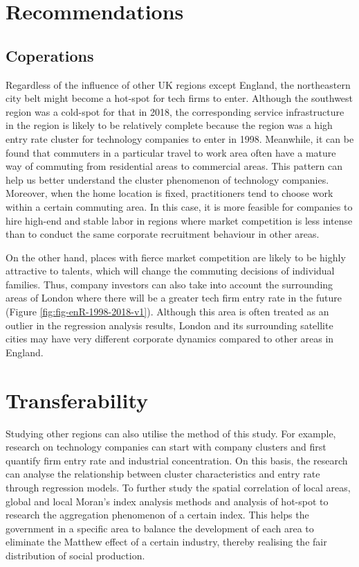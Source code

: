 \documentclass[
  12pt,
  oneside]{book}
\begin{document}
\hypertarget{recommendations}{%
\section{Recommendations}\label{recommendations}}

\hypertarget{coperations}{%
\subsection{Coperations}\label{coperations}}

Regardless of the influence of other UK regions except England, the northeastern city belt might become a hot-spot for tech firms to enter. Although the southwest region was a cold-spot for that in 2018, the corresponding service infrastructure in the region is likely to be relatively complete because the region was a high entry rate cluster for technology companies to enter in 1998. Meanwhile, it can be found that commuters in a particular travel to work area often have a mature way of commuting from residential areas to commercial areas. This pattern can help us better understand the cluster phenomenon of technology companies. Moreover, when the home location is fixed, practitioners tend to choose work within a certain commuting area. In this case, it is more feasible for companies to hire high-end and stable labor in regions where market competition is less intense than to conduct the same corporate recruitment behaviour in other areas.

On the other hand, places with fierce market competition are likely to be highly attractive to talents, which will change the commuting decisions of individual families. Thus, company investors can also take into account the surrounding areas of London where there will be a greater tech firm entry rate in the future (Figure \ref{fig:fig-enR-1998-2018-v1}). Although this area is often treated as an outlier in the regression analysis results, London and its surrounding satellite cities may have very different corporate dynamics compared to other areas in England.

\hypertarget{transferability}{%
\section{Transferability}\label{transferability}}

Studying other regions can also utilise the method of this study. For example, research on technology companies can start with company clusters and first quantify firm entry rate and industrial concentration. On this basis, the research can analyse the relationship between cluster characteristics and entry rate through regression models. To further study the spatial correlation of local areas, global and local Moran's index analysis methods and analysis of hot-spot to research the aggregation phenomenon of a certain index. This helps the government in a specific area to balance the development of each area to eliminate the Matthew effect of a certain industry, thereby realising the fair distribution of social production.
\end{document}
